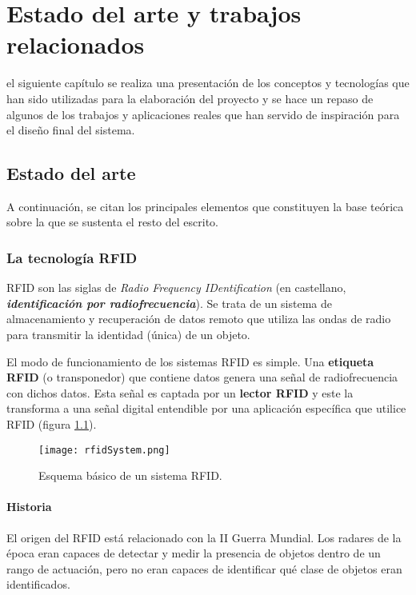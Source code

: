 
\chapter{Estado del arte y trabajos relacionados}
\label{chap:antecedents}
 el siguiente capítulo se realiza una presentación de los conceptos y
tecnologías que han sido utilizadas para la elaboración del proyecto y se hace
un repaso de algunos de los trabajos y aplicaciones reales que han servido de
inspiración para el diseño final del sistema.

\section{Estado del arte}
A continuación, se citan los principales elementos que constituyen la base
teórica sobre la que se sustenta el resto del escrito.

  \subsection{La tecnología \acs{RFID}}
\acs{RFID} son las siglas de \emph{Radio Frequency IDentification} (en
castellano, \emph{\textbf{identificación por radiofrecuencia}}). Se trata de un
sistema de almacenamiento y recuperación de datos remoto que utiliza las ondas
de radio para transmitir la identidad (única) de un objeto.

El modo de funcionamiento de los sistemas \acs{RFID} es simple. Una
\textbf{etiqueta \acs{RFID}} (o transponedor) que contiene datos genera una
señal de radiofrecuencia con dichos datos. Esta señal es captada por un
\textbf{lector \acs{RFID}} y este la transforma a una señal digital entendible
por una aplicación específica que utilice \acs{RFID} (figura
\ref{fig:rfidSystem}).

\begin{figure}[!h]
  \begin{center}
    \texttt{[image: rfidSystem.png]}
    \caption{Esquema básico de un sistema \acs{RFID}.}
    \label{fig:rfidSystem}
  \end{center}
\end{figure}

    \subsubsection{Historia}
  El origen del \acs{RFID} está relacionado con la II Guerra Mundial. Los
  radares de la época eran capaces de detectar y medir la presencia de objetos
  dentro de un rango de actuación, pero no eran capaces de identificar qué
  clase de objetos eran identificados.

